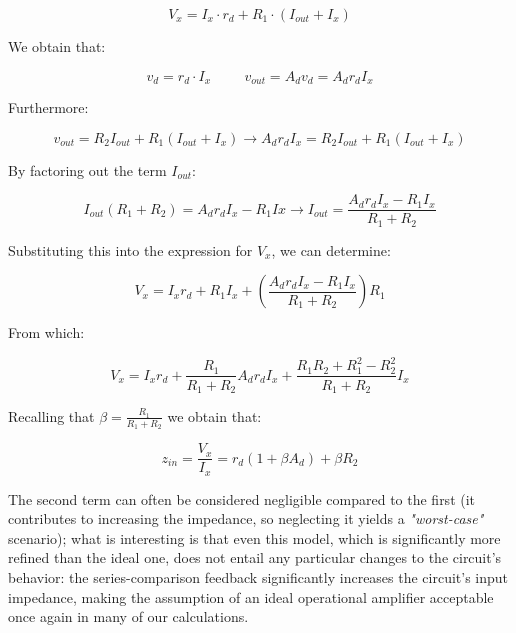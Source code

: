 \documentclass[../main.tex]{subfiles}
\begin{document}
\begin{equation}
	V_x = I_x \cdot r_d + R_1 \cdot (I_{out} + I_x)
\end{equation}

We obtain that:

\begin{equation}
	v_d = r_d \cdot I_x \hspace{1cm} v_{out} = A_dv_d = A_dr_dI_x
\end{equation}

Furthermore:

\begin{equation}
	v_{out} = R_2 I_{out} + R_1(I_{out} + I_x) \rightarrow A_dr_dI_x = R_2I_{out} + R_1(I_{out} + I_x)
\end{equation}

By factoring out the term $I_{out}$:

\begin{equation}
	I_{out}(R_1 + R_2) = A_dr_dI_x - R_1Ix \rightarrow I_{out} = \frac{A_dr_dI_x - R_1I_x}{R_1 + R_2}	
\end{equation}

Substituting this into the expression for $V_x$, we can determine:

\begin{equation}
	V_x = I_xr_d + R_1I_x + \left( \frac{A_dr_dI_x - R_1I_x}{R_1 + R_2} \right) R_1
\end{equation}

From which:


\begin{equation}
	V_x = I_xr_d + \frac{R_1}{R_1 + R_2} A_dr_dI_x + \frac{R_1R_2 + R_1^2 - R_2^2}{R_1 + R_2} I_x
\end{equation}

Recalling that $\beta = \frac{R_1}{R_1 + R_2}$ we obtain that:

\begin{equation}
	z_{in} = \frac{V_x}{I_x} = r_d (1+ \beta A_d) + \beta R_2
\end{equation}

The second term can often be considered negligible compared to the first
(it contributes to increasing the impedance, so neglecting it yields a
\textit{"worst-case"} scenario); what is interesting is that even this model, which is significantly more refined than the ideal one, does not entail any particular changes to the circuit’s behavior: the series-comparison feedback significantly increases the circuit’s input impedance, making the assumption of an ideal operational amplifier acceptable once again in many of our calculations.\\
\end{document}
